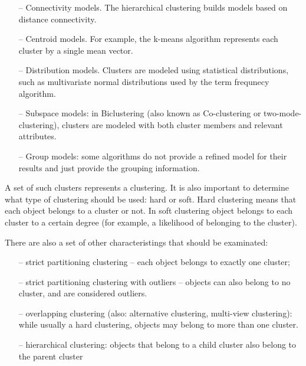\begin{enumerate}

\item[--] Connectivity models. The hierarchical clustering builds models based on distance connectivity.

\item[--] Centroid models. For example, the k-means algorithm represents each cluster by a single mean vector.

\item[--] Distribution models. Clusters are modeled using statistical distributions, such as multivariate normal distributions used by the term frequnecy algorithm. 

\item[--] Subspace models: in Biclustering (also known as Co-clustering or two-mode-clustering), clusters are modeled with both cluster members and relevant attributes.

\item[--] Group models: some algorithms do not provide a refined model for their results and just provide the grouping information.

\end{enumerate}

A set of such clusters represents a clustering. It is also important to determine what type of clustering should be used: hard or soft. Hard clustering means that each object belongs to a cluster or not. In soft clustering object belongs to each cluster to a certain degree (for example, a likelihood of belonging to the cluster). 

There are also a set of other characteristings that should be examinated: 

\begin{enumerate}
\item[--] strict partitioning clustering -- each object belongs to exactly one cluster;

\item[--] strict partitioning clustering with outliers -- objects can also belong to no cluster, and are considered outliers.

\item[--] overlapping clustering (also: alternative clustering, multi-view clustering): while usually a hard clustering, objects may belong to more than one cluster.

\item[--] hierarchical clustering: objects that belong to a child cluster also belong to the parent cluster
\end{enumerate}

